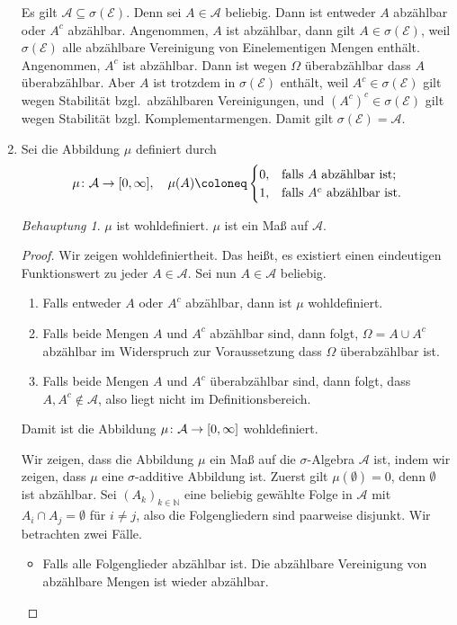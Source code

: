 \documentclass[draft,a5paper]{article}
\theoremstyle{remark}
\newtheorem*{Behauptung}{Behauptung}
\begin{document}
\begin{enumerate}
  Es gilt \(\mathcal{A} \subseteq \sigma(\mathcal{E})\).  Denn sei
  \(A \in \mathcal{A}\) beliebig.  Dann ist entweder \(A\) abzählbar oder
  \(A^{c}\) abzählbar.  Angenommen, \(A\) ist abzählbar, dann gilt
  \(A \in \sigma(\mathcal{E})\), weil \(\sigma(\mathcal{E})\) alle abzählbare Vereinigung von
  Einelementigen Mengen enthält.  Angenommen, \(A^{c}\) ist abzählbar.
  Dann ist wegen \(\Omega\) überabzählbar dass \(A\) überabzählbar.  Aber
  \(A\) ist trotzdem in \(\sigma(\mathcal{E})\) enthält, weil
  \(A^{c} \in \sigma(\mathcal{E})\) gilt wegen Stabilität bzgl.\ abzählbaren
  Vereinigungen, und \((A^{c})^{c} \in \sigma(\mathcal{E})\) gilt wegen Stabilität
  bzgl. Komplementarmengen.  Damit gilt \(\sigma(\mathcal{E}) = \mathcal{A}\).
\item Sei die Abbildung \(\mu\) definiert durch
  \begin{align*}
    \mu\colon \mathcal{A} \to \interval{0}{\infty}, \quad \mu(A) \coloneq
    \begin{cases}
      0, & \text{falls } A \text{ abzählbar ist;} \\
      1, & \text{falls } A^{c} \text{ abzählbar ist.}
    \end{cases}
  \end{align*}
  \begin{Behauptung}
    \(\mu\) ist wohldefiniert.  \(\mu\) ist ein Maß auf \(\mathcal{A}\).
  \end{Behauptung}
  \begin{proof}
    Wir zeigen wohldefiniertheit.  Das heißt, es existiert einen
    eindeutigen Funktionswert zu jeder \(A \in \mathcal{A}\).  Sei nun \(A \in \mathcal{A}\)
    beliebig.
    \begin{enumerate}
    \item Falls entweder \(A\) oder \(A^{c}\) abzählbar, dann ist \(\mu\)
      wohldefiniert.
    \item Falls beide Mengen \(A\) und \(A^{c}\) abzählbar sind, dann
      folgt, \(\Omega = A \cup A^{c}\) abzählbar im Widerspruch zur
      Voraussetzung dass \(\Omega\) überabzählbar ist.
    \item Falls beide Mengen \(A\) und \(A^{c}\) überabzählbar sind, dann
      folgt, dass \(A, A^{c} \notin \mathcal{A}\), also liegt nicht im Definitionsbereich.
    \end{enumerate}
    Damit ist die Abbildung \(\mu\colon \mathcal{A} \to \interval{0}{\infty}\) wohldefiniert.

    Wir zeigen, dass die Abbildung \(\mu\) ein Maß auf die
    \(\sigma\)-Algebra \(\mathcal{A}\) ist, indem wir zeigen, dass
    \(\mu\) eine \(\sigma\)-additive Abbildung ist.  Zuerst gilt
    \(\mu(\emptyset) = 0\), denn \(\emptyset\) ist abzählbar. Sei
    \((A_{k})_{k \in \mathbb{N}} \) eine beliebig gewählte Folge in
    \(\mathcal{A}\) mit \(A_{i} \cap A_{j} = \emptyset\) für
    \(i \ne j\), also die Folgengliedern sind paarweise disjunkt.  Wir
    betrachten zwei Fälle.
    \begin{itemize}
    \item Falls alle Folgenglieder abzählbar ist.  Die abzählbare
      Vereinigung von abzählbare Mengen ist wieder abzählbar.


\end{itemize}
\end{proof}
\end{enumerate}
\end{document}
